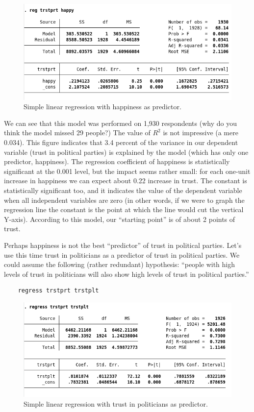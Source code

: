 \documentclass{article}
\begin{document}
\begin{figure}[H]
	\includegraphics[width=\linewidth]{Reg1.png}
	\caption{Simple linear regression with happiness as predictor.}
\end{figure}

We can see that this model was performed on 1,930 respondents (why do you think the model missed 29 people?) The value of $R^2$ is not impressive (a mere 0.034). This figure indicates that 3.4 percent of the variance in our dependent variable (trust in political parties) is explained by the model (which has only one predictor, happiness). The regression coefficient of happiness is statistically significant at the 0.001 level, but the impact seems rather small: for each one-unit increase in happiness we can expect about 0.22 increase in trust. The constant is statistically significant too, and it indicates the value of the dependent variable when all independent variables are zero (in other words, if we were to graph the regression line the constant is the point at which the line would cut the vertical Y-axis). According to this model, our ``starting point'' is of about 2 points of trust.

Perhaps happiness is not the best ``predictor'' of trust in political parties. Let's use this time trust in politicians as a predictor of trust in political parties. We could assume the following (rather redundant) hypothesis: ``people with high levels of trust in politicians will also show high levels of trust in political parties.''

\begin{lstlisting}
	regress trstprt trstplt
\end{lstlisting}

\begin{figure}[H]
	\includegraphics[width=\linewidth]{Reg2.png}
	\caption{Simple linear regression with trust in politicians as predictor.}
\end{figure}
\end{document}
